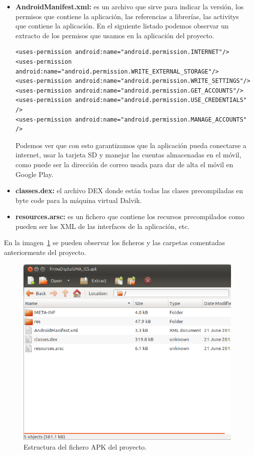 \begin{itemize}
\item \textbf{AndroidManifest.xml:} es un archivo que sirve para indicar la versión, los permisos que contiene la aplicación, las referencias a librerías, las activitys que contiene la aplicación. En el siguiente listado podemos observar un extracto de los permisos que usamos en la aplicación del proyecto.

\begin{lstlisting}[style=XML]
<uses-permission android:name="android.permission.INTERNET"/>
<uses-permission android:name="android.permission.WRITE_EXTERNAL_STORAGE"/>
<uses-permission android:name="android.permission.WRITE_SETTINGS"/>
<uses-permission android:name="android.permission.GET_ACCOUNTS"/>
<uses-permission android:name="android.permission.USE_CREDENTIALS" />
<uses-permission android:name="android.permission.MANAGE_ACCOUNTS" />
\end{lstlisting}

Podemos ver que con esto garantizamos que la aplicación pueda conectarse a internet, usar la tarjeta SD y manejar las cuentas almacenadas en el móvil, como puede ser la dirección de correo usada para dar de alta el móvil en Google Play.

\item \textbf{classes.dex:} el archivo DEX donde están todas las clases precompiladas en byte code para la máquina virtual Dalvik.

\item \textbf{resources.arsc:} es un fichero que contiene los recursos precompilados como pueden ser los XML de las interfaces de la aplicación, etc.

\end{itemize}

En la imagen~\ref{fig:estructuraAPK} se pueden observar los ficheros y las carpetas comentadas anteriormente del proyecto.

\begin{figure}[h]
  \centering
    \includegraphics[scale=0.8]{./Android/imagenes/estructuraAPK.png}
  \caption{Estructura del fichero APK del proyecto.}
  \label{fig:estructuraAPK}
\end{figure}

